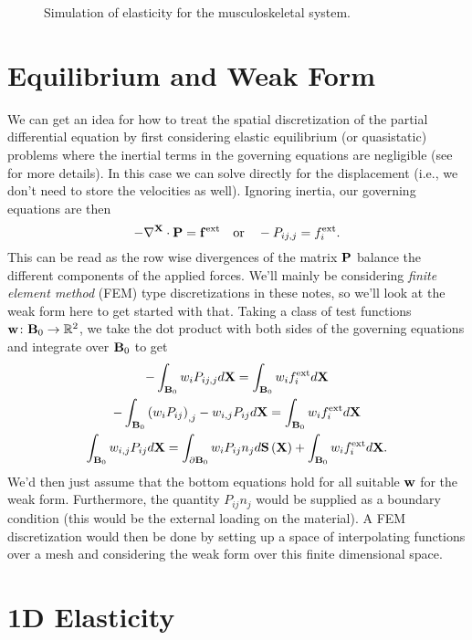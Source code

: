 \begin{figure}
\caption{Simulation of elasticity for the musculoskeletal system.}
\end{figure}

\section*{Equilibrium and Weak Form}

We can get an idea for how to treat the spatial discretization of the partial differential equation by first considering elastic equilibrium (or quasistatic) problems where the inertial terms in the governing equations are negligible (see \cite{Teran05a} for more details). In this case we can solve directly for the displacement (i.e., we don't need to store the velocities as well). Ignoring inertia, our governing equations are then
\begin{equation*}
-\nabla^{\mathbf{X}} \cdot \mathbf{P} = \mathbf{f}^{\text{ext}} \quad \text{or} \quad -P_{ij,j} = f^{\text{ext}}_i.
\end{equation*}
This can be read as the row wise divergences of the matrix $\mathbf{P}$ balance the different components of the applied forces. We'll mainly be considering \emph{finite element method} (FEM) type discretizations in these notes, so we'll look at the weak form here to get started with that. Taking a class of test functions $\mathbf{w} \colon \mathbf{B}_0 \to \mathbb{R}^2$, we take the dot product with both sides of the governing equations and integrate over $\mathbf{B}_0$ to get
\begin{gather*}
-\int_{\mathbf{B}_0} w_i P_{ij,j} d\mathbf{X} = \int_{\mathbf{B}_0} w_i f^{\text{ext}}_i d\mathbf{X} \\
-\int_{\mathbf{B}_0} \left( w_i P_{ij} \right)_{,j} - w_{i,j} P_{ij} d\mathbf{X} = \int_{\mathbf{B}_0} w_i f^{\text{ext}}_i d\mathbf{X} \\
\int_{\mathbf{B}_0} w_{i,j} P_{ij} d\mathbf{X} = \int_{\partial\mathbf{B}_0} w_i P_{ij} n_j d\mathbf{S} \left( \mathbf{X} \right) + \int_{\mathbf{B}_0} w_i f^{\text{ext}}_i d\mathbf{X}.
\end{gather*}
We'd then just assume that the bottom equations hold for all suitable $\mathbf{w}$ for the weak form. Furthermore, the quantity $P_{ij} n_j$ would be supplied as a boundary condition (this would be the external loading on the material). A FEM discretization would then be done by setting up a space of interpolating functions over a mesh and considering the weak form over this finite dimensional space.

\section*{1D Elasticity}

